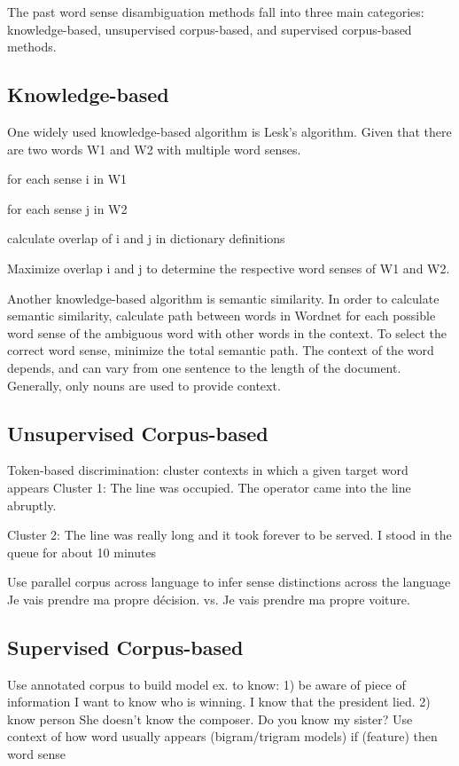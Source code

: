 \documentclass[10pt, letterpaper]{article}
\begin{document}
        The past word sense disambiguation methods fall into three main categories: knowledge-based, unsupervised corpus-based, and supervised corpus-based methods.

	\subsection{Knowledge-based}

        One widely used knowledge-based algorithm is Lesk's algorithm.  Given that there are two words W1 and W2 with multiple word senses.

	for each sense i in W1

	   for each sense j in W2

	      calculate overlap of i and j in dictionary definitions

	Maximize overlap i and j to determine the respective word senses of W1 and W2.
	
        Another knowledge-based algorithm is semantic similarity.  In order to calculate semantic similarity, calculate path between words in Wordnet for each possible word sense of the ambiguous word with other words in the context.  To select the correct word sense, minimize the total semantic path.  The context of the word depends, and can vary from one sentence to the length of the document.  Generally, only nouns are used to provide context. 
	
	\subsection{Unsupervised Corpus-based}
	 Token-based discrimination: cluster contexts in which a given target word appears
	 Cluster 1: The line was occupied. 
	 The operator came into the line abruptly.

	 Cluster 2: The line was really long and it took forever to be served. 
 	 I stood in the queue for about 10 minutes

 	 Use parallel corpus across language to infer sense distinctions across the language
	 Je vais prendre ma propre décision.
	 vs.
	 Je vais prendre ma propre voiture.
	\subsection{Supervised Corpus-based}
	 Use annotated corpus to build model
 	 ex. to know: 1) be aware of piece of information
                              I want to know who is winning.
                              I know that the president lied.
                             2) know person
                             She doesn't know the composer.
                             Do you know my sister?
	 Use context of how word usually appears (bigram/trigram models)
 	 if (feature) then word sense
\end{document}
